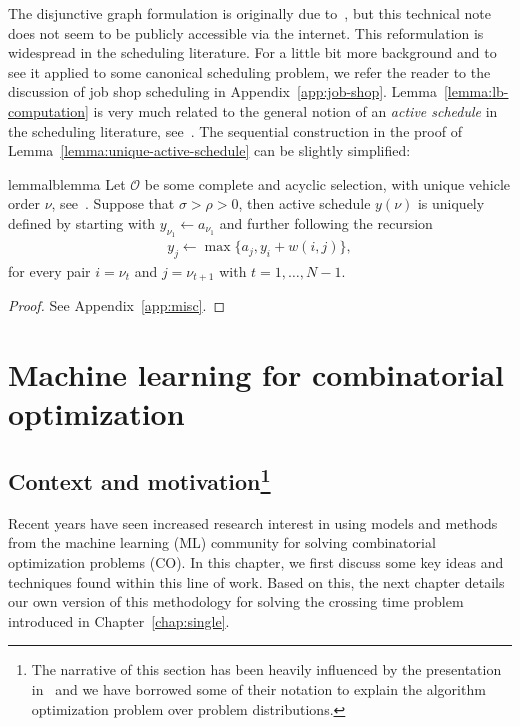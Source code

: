 \documentclass[a4paper]{report}
\theoremstyle{definition}
\theoremstyle{plain}
\begin{document}
The disjunctive graph formulation is originally due
to~\cite{roy1964disjunctive}, but this technical note does not seem to be
publicly accessible via the internet.
%
This reformulation is widespread in the scheduling literature. For a little bit
more background and to see it applied to some canonical scheduling problem, we
refer the reader to the discussion of job shop scheduling in
Appendix~\ref{app:job-shop}.
%
Lemma~\ref{lemma:lb-computation} is very much related to the general notion of
an \emph{active schedule} in the scheduling literature, see~\cite[Definition
2.3.3]{pinedoSchedulingTheoryAlgorithms2016}.
%
The sequential construction in the proof of
Lemma~\ref{lemma:unique-active-schedule} can be slightly simplified:

\begin{restatable}{lemma}{lblemma}\label{lemma:lb-computation}
  Let $\mathcal{O}$ be some complete and acyclic selection, with unique vehicle
  order $\nu$, see~. Suppose that $\sigma > \rho > 0$,
  then active schedule $y(\nu)$ is uniquely defined by starting with
  $y_{\nu_1} \leftarrow a_{\nu_1}$ and further following the recursion
\begin{align}
  \label{eq:lb-computation}
  y_{j} \leftarrow \max \{ a_{j}, y_i + w(i, j) \} ,
\end{align}
for every pair $i = \nu_t$ and $j = \nu_{t+1}$ with $t = 1, \dots, N-1$.
\end{restatable}
\begin{proof}
  See Appendix~\ref{app:misc}.
\end{proof}


\chapter{Machine learning for combinatorial optimization}\label{chap:ml-co}

\section[Context and motivation]{Context and motivation\footnote{The narrative of this section has
    been heavily influenced by the presentation
    in~\cite{bengioMachineLearningCombinatorial2020} and we have borrowed some
    of their notation to explain the algorithm optimization problem over problem
    distributions.}}

Recent years have seen increased research interest in using models and methods
from the machine learning (ML) community for solving combinatorial optimization
problems (CO).
%
In this chapter, we first discuss some key ideas and techniques found within
this line of work.
%
Based on this, the next chapter details our own version of this methodology for
solving the crossing time problem introduced in Chapter~\ref{chap:single}.
\end{document}

